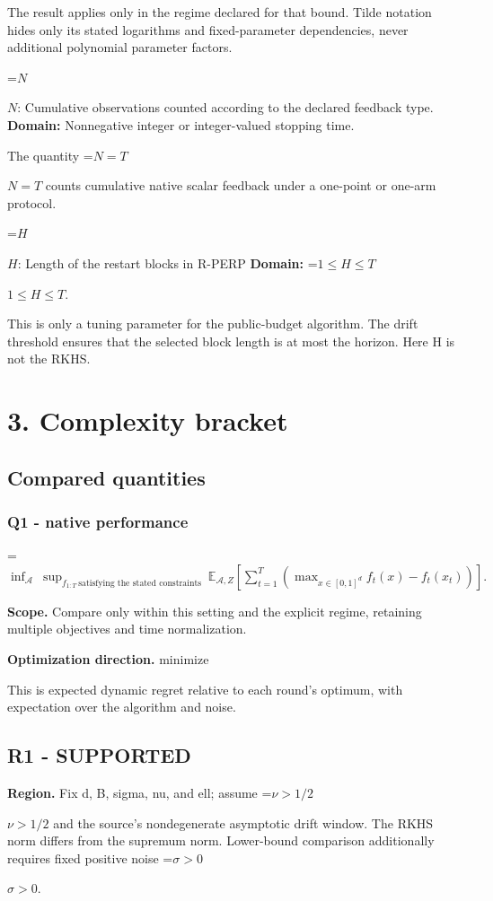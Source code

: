 \documentclass[10pt,a4paper]{article}
\newcommand{\AtlasMath}[1]{\par\begingroup\centering\setbox0=\hbox{$\displaystyle #1$}\ifdim\wd0>1.4\linewidth\typeout{ATLAS WIDE FORMULA: \the\wd0}\fi\ifdim\wd0>\linewidth\resizebox{\linewidth}{!}{\box0}\else\box0\fi\par\endgroup}
\newcommand{\AtlasInlineMath}[1]{\begingroup\setbox0=\hbox{$#1$}\ifdim\wd0>.4\linewidth\endgroup\AtlasMath{#1}\else\endgroup$#1$\fi}
\begin{document}
The result applies only in the regime declared for that bound. Tilde notation hides only its stated logarithms and fixed-parameter dependencies, never additional polynomial parameter factors.

\AtlasInlineMath{N}: Cumulative observations counted according to the declared feedback type. \textbf{Domain:} Nonnegative integer or integer-valued stopping time.

The quantity \AtlasInlineMath{N=T} counts cumulative native scalar feedback under a one-point or one-arm protocol.

\AtlasInlineMath{H}: Length of the restart blocks in R-PERP \textbf{Domain:} \AtlasInlineMath{1\le H\le T}.

This is only a tuning parameter for the public-budget algorithm. The drift threshold ensures that the selected block length is at most the horizon. Here H is not the RKHS.

\section{3. Complexity bracket}
\subsection{Compared quantities}
\subsubsection{Q1 - native performance}
\AtlasMath{\inf_{\mathcal A}\ \sup_{f_{1:T}\ \text{satisfying the stated constraints}}\ \mathbb E_{\mathcal A,Z}\!\left[\sum_{t=1}^{T}\left(\max_{x\in[0,1]^d}f_t(x)-f_t(x_t)\right)\right].}
\textbf{Scope.} Compare only within this setting and the explicit regime, retaining multiple objectives and time normalization.

\textbf{Optimization direction.} minimize

This is expected dynamic regret relative to each round's optimum, with expectation over the algorithm and noise.

\subsection{R1 - SUPPORTED}
\textbf{Region.} Fix d, B, sigma, nu, and ell; assume \AtlasInlineMath{\nu>1/2} and the source's nondegenerate asymptotic drift window. The RKHS norm differs from the supremum norm. Lower-bound comparison additionally requires fixed positive noise \AtlasInlineMath{\sigma>0}.
\end{document}
